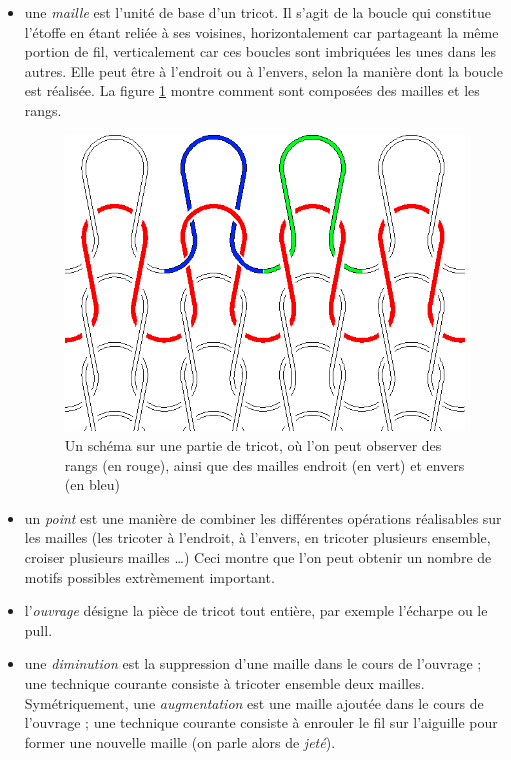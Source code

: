 \documentclass{article}
\begin{document}
\begin{itemize}
\item une \emph{maille} est l'unité de base d'un tricot. Il s'agit de
  la boucle qui constitue l'étoffe en étant reliée à ses voisines,
  horizontalement car partageant la même portion de fil, verticalement
  car ces boucles sont imbriquées les unes dans les autres. Elle peut
  être à l'endroit ou à l'envers, selon la manière dont la boucle est
  réalisée. La figure \ref{maille} montre comment sont composées des mailles
  et les rangs.

\begin{figure}[!ht]
  \centering \includegraphics[scale=0.25]{../presentation/Knit-schematic2.png}
  \caption{Un schéma sur une partie de tricot, où l'on peut observer des rangs 
  (en rouge), ainsi que des mailles endroit (en vert) et envers (en bleu)}
  \label{maille}
\end{figure}

\item un \emph{point} est une manière de combiner les différentes
  opérations réalisables sur les mailles (les tricoter à l'endroit, à
  l'envers, en tricoter plusieurs ensemble, croiser plusieurs mailles
  \dots) Ceci montre que l'on peut obtenir un nombre de motifs possibles 
  extrèmement important.
\item l'\emph{ouvrage} désigne la pièce de tricot tout entière, par
  exemple l'écharpe ou le pull.
\item une \emph{diminution} est la suppression d'une maille dans le
  cours de l'ouvrage ; une technique courante consiste à tricoter
  ensemble deux mailles. Symétriquement, une \emph{augmentation} est
  une maille ajoutée dans le cours de l'ouvrage ; une technique
  courante consiste à enrouler le fil sur l'aiguille pour former une
  nouvelle maille (on parle alors de \emph{jeté}).
\end{itemize}
\end{document}
